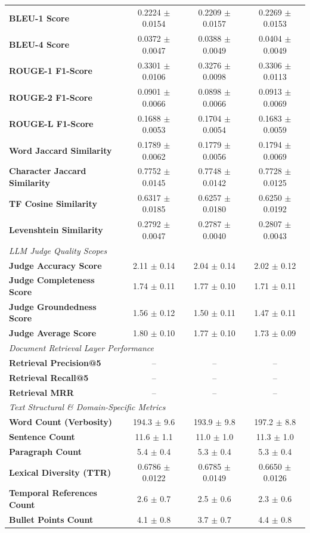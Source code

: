 \begin{table}[t]
\begin{tabular}{lccc}
\textbf{BLEU-1 Score} & 0.2224 $\pm$ 0.0154 & 0.2209 $\pm$ 0.0157 & 0.2269 $\pm$ 0.0153 \\
\textbf{BLEU-4 Score} & 0.0372 $\pm$ 0.0047 & 0.0388 $\pm$ 0.0049 & 0.0404 $\pm$ 0.0049 \\
\textbf{ROUGE-1 F1-Score} & 0.3301 $\pm$ 0.0106 & 0.3276 $\pm$ 0.0098 & 0.3306 $\pm$ 0.0113 \\
\textbf{ROUGE-2 F1-Score} & 0.0901 $\pm$ 0.0066 & 0.0898 $\pm$ 0.0066 & 0.0913 $\pm$ 0.0069 \\
\textbf{ROUGE-L F1-Score} & 0.1688 $\pm$ 0.0053 & 0.1704 $\pm$ 0.0054 & 0.1683 $\pm$ 0.0059 \\
\textbf{Word Jaccard Similarity} & 0.1789 $\pm$ 0.0062 & 0.1779 $\pm$ 0.0056 & 0.1794 $\pm$ 0.0069 \\
\textbf{Character Jaccard Similarity} & 0.7752 $\pm$ 0.0145 & 0.7748 $\pm$ 0.0142 & 0.7728 $\pm$ 0.0125 \\
\textbf{TF Cosine Similarity} & 0.6317 $\pm$ 0.0185 & 0.6257 $\pm$ 0.0180 & 0.6250 $\pm$ 0.0192 \\
\textbf{Levenshtein Similarity} & 0.2792 $\pm$ 0.0047 & 0.2787 $\pm$ 0.0040 & 0.2807 $\pm$ 0.0043 \\
\midrule
\multicolumn{4}{l}{\textit{LLM Judge Quality Scopes}} \\
\textbf{Judge Accuracy Score} & 2.11 $\pm$ 0.14 & 2.04 $\pm$ 0.14 & 2.02 $\pm$ 0.12 \\
\textbf{Judge Completeness Score} & 1.74 $\pm$ 0.11 & 1.77 $\pm$ 0.10 & 1.71 $\pm$ 0.11 \\
\textbf{Judge Groundedness Score} & 1.56 $\pm$ 0.12 & 1.50 $\pm$ 0.11 & 1.47 $\pm$ 0.11 \\
\textbf{Judge Average Score} & 1.80 $\pm$ 0.10 & 1.77 $\pm$ 0.10 & 1.73 $\pm$ 0.09 \\
\midrule
\multicolumn{4}{l}{\textit{Document Retrieval Layer Performance}} \\
\textbf{Retrieval Precision@5} & -- & -- & -- \\
\textbf{Retrieval Recall@5} & -- & -- & -- \\
\textbf{Retrieval MRR} & -- & -- & -- \\
\midrule
\multicolumn{4}{l}{\textit{Text Structural \& Domain-Specific Metrics}} \\
\textbf{Word Count (Verbosity)} & 194.3 $\pm$ 9.6 & 193.9 $\pm$ 9.8 & 197.2 $\pm$ 8.8 \\
\textbf{Sentence Count} & 11.6 $\pm$ 1.1 & 11.0 $\pm$ 1.0 & 11.3 $\pm$ 1.0 \\
\textbf{Paragraph Count} & 5.4 $\pm$ 0.4 & 5.3 $\pm$ 0.4 & 5.3 $\pm$ 0.4 \\
\textbf{Lexical Diversity (TTR)} & 0.6786 $\pm$ 0.0122 & 0.6785 $\pm$ 0.0149 & 0.6650 $\pm$ 0.0126 \\
\textbf{Temporal References Count} & 2.6 $\pm$ 0.7 & 2.5 $\pm$ 0.6 & 2.3 $\pm$ 0.6 \\
\textbf{Bullet Points Count} & 4.1 $\pm$ 0.8 & 3.7 $\pm$ 0.7 & 4.4 $\pm$ 0.8 \\
\bottomrule
\end{tabular}
\end{table}